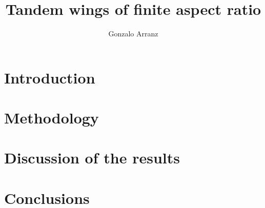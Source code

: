\documentclass[a4paper]{article}
\author{Gonzalo Arranz}
\title{Tandem wings of finite aspect ratio}
\begin{document}
\maketitle

\section{Introduction\label{s:intro}}


\section{Methodology\label{s:met}}


\section{Discussion of the results\label{s:results}}

\section{Conclusions\label{s:conc}}
\end{document}
